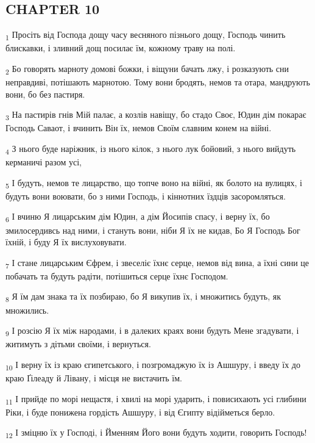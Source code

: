 \subsection{CHAPTER 10}
\begin{tcolorbox}
\textsubscript{1} Просіть від Господа дощу часу весняного пізнього дощу, Господь чинить блискавки, і зливний дощ посилає їм, кожному траву на полі.
\end{tcolorbox}
\begin{tcolorbox}
\textsubscript{2} Бо говорять марноту домові божки, і віщуни бачать лжу, і розказують сни неправдиві, потішають марнотою. Тому вони бродять, немов та отара, мандрують вони, бо без пастиря.
\end{tcolorbox}
\begin{tcolorbox}
\textsubscript{3} На пастирів гнів Мій палає, а козлів навіщу, бо стадо Своє, Юдин дім покарає Господь Саваот, і вчинить Він їх, немов Своїм славним конем на війні.
\end{tcolorbox}
\begin{tcolorbox}
\textsubscript{4} З нього буде наріжник, із нього кілок, з нього лук бойовий, з нього вийдуть керманичі разом усі,
\end{tcolorbox}
\begin{tcolorbox}
\textsubscript{5} І будуть, немов те лицарство, що топче воно на війні, як болото на вулицях, і будуть вони воювати, бо з ними Господь, і кіннотних їздців засоромляться.
\end{tcolorbox}
\begin{tcolorbox}
\textsubscript{6} І вчиню Я лицарським дім Юдин, а дім Йосипів спасу, і верну їх, бо змилосердивсь над ними, і стануть вони, ніби Я їх не кидав, Бо Я Господь Бог їхній, і буду Я їх вислуховувати.
\end{tcolorbox}
\begin{tcolorbox}
\textsubscript{7} І стане лицарським Єфрем, і звеселіє їхнє серце, немов від вина, а їхні сини це побачать та будуть радіти, потішиться серце їхнє Господом.
\end{tcolorbox}
\begin{tcolorbox}
\textsubscript{8} Я їм дам знака та їх позбираю, бо Я викупив їх, і множитись будуть, як множились.
\end{tcolorbox}
\begin{tcolorbox}
\textsubscript{9} І розсію Я їх між народами, і в далеких краях вони будуть Мене згадувати, і житимуть з дітьми своїми, і вернуться.
\end{tcolorbox}
\begin{tcolorbox}
\textsubscript{10} І верну їх із краю єгипетського, і позгромаджую їх із Ашшуру, і введу їх до краю Ґілеаду й Лівану, і місця не вистачить їм.
\end{tcolorbox}
\begin{tcolorbox}
\textsubscript{11} І прийде по морі нещастя, і хвилі на морі ударить, і повисихають усі глибини Ріки, і буде понижена гордість Ашшуру, і від Єгипту відійметься берло.
\end{tcolorbox}
\begin{tcolorbox}
\textsubscript{12} І зміцню їх у Господі, і Йменням Його вони будуть ходити, говорить Господь!
\end{tcolorbox}
